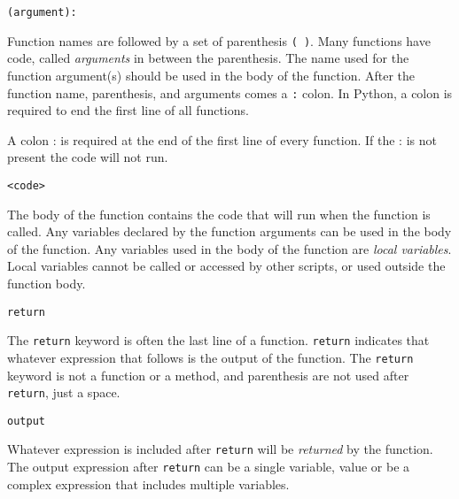 \documentclass{book}
\newcommand{\passthrough}[1]{#1}
\begin{document}
\begin{lstlisting}
(argument):
\end{lstlisting}

Function names are followed by a set of parenthesis
\passthrough{\lstinline!( )!}. Many functions have code, called
\emph{arguments} in between the parenthesis. The name used for the
function argument(s) should be used in the body of the function. After
the function name, parenthesis, and arguments comes a
\passthrough{\lstinline!:!} colon. In Python, a colon is required to end
the first line of all functions.
    




    
        A colon : is required at the end of the first line of every function. If
the : is not present the code will not run.
    




    
        \begin{lstlisting}
<code>
\end{lstlisting}

The body of the function contains the code that will run when the
function is called. Any variables declared by the function arguments can
be used in the body of the function. Any variables used in the body of
the function are \emph{local variables}. Local variables cannot be
called or accessed by other scripts, or used outside the function body.

\begin{lstlisting}
return
\end{lstlisting}

The \passthrough{\lstinline!return!} keyword is often the last line of a
function. \passthrough{\lstinline!return!} indicates that whatever
expression that follows is the output of the function. The
\passthrough{\lstinline!return!} keyword is not a function or a method,
and parenthesis are not used after \passthrough{\lstinline!return!},
just a space.

\begin{lstlisting}
output
\end{lstlisting}

Whatever expression is included after \passthrough{\lstinline!return!}
will be \emph{returned} by the function. The output expression after
\passthrough{\lstinline!return!} can be a single variable, value or be a
complex expression that includes multiple variables.
    
\end{document}
